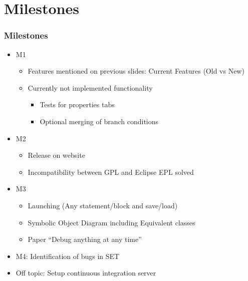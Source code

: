 \documentclass[accentcolor=tud9d,colorbacktitle,inverttitle,landscape,english,presentation,t]{tudbeamer}
\begin{document}
\section{Milestones}
   \begin{frame}[t]
		\frametitle{Milestones}
      
      \begin{itemize}
         \item M1
               \begin{itemize}
                  \item Features mentioned on previous slides: Current Features (Old vs New)
                  \item Currently not implemented functionality
                        \begin{itemize}
                           \item Tests for properties tabs
                           \item Optional merging of branch conditions
                        \end{itemize}
               \end{itemize}         
         \item M2
               \begin{itemize}
                  \item Release on \KeY website
                  \item Incompatibility between \KeY GPL and Eclipse EPL solved
               \end{itemize}         
         \item M3
               \begin{itemize}
                  \item Launching (Any statement/block and save/load)
                  \item Symbolic Object Diagram including Equivalent classes
                  \item Paper "`Debug anything at any time"'
               \end{itemize}
         \item M4: Identification of bugs in SET
         \item Off topic: Setup continuous integration server
      \end{itemize}
	\end{frame}
   
\end{document}

